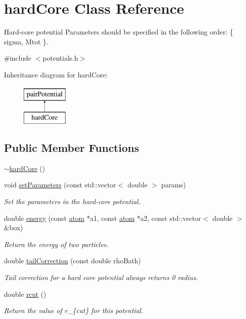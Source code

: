 \hypertarget{classhard_core}{\section{hard\-Core Class Reference}
\label{classhard_core}
}


Hard-\/core potential Parameters should be specified in the following order\-: \{ sigma, Mtot \}.  




{\ttfamily \#include $<$potentials.\-h$>$}

Inheritance diagram for hard\-Core\-:\begin{figure}[H]
\begin{center}
\leavevmode
\includegraphics[height=2.000000cm]{classhard_core}
\end{center}
\end{figure}
\subsection*{Public Member Functions}
\begin{DoxyCompactItemize}
\item 
\hyperlink{classhard_core_aea5b04b2f9271269d6365ff7ed633151}{$\sim$hard\-Core} ()
\item 
void \hyperlink{classhard_core_a2bbf6a77445f5cb5fc1a3c37ba0e6566}{set\-Parameters} (const std\-::vector$<$ double $>$ params)
\begin{DoxyCompactList}\small\item\em Set the parameters in the hard-\/core potential. \end{DoxyCompactList}\item 
double \hyperlink{classhard_core_a8b7bb56ce5c3ad31a74d352da76164e2}{energy} (const \hyperlink{classatom}{atom} $\ast$a1, const \hyperlink{classatom}{atom} $\ast$a2, const std\-::vector$<$ double $>$ \&box)
\begin{DoxyCompactList}\small\item\em Return the energy of two particles. \end{DoxyCompactList}\item 
double \hyperlink{classhard_core_a90c73dbda39a9c48f1f26474474183e4}{tail\-Correction} (const double rho\-Bath)
\begin{DoxyCompactList}\small\item\em Tail correction for a hard core potential always returns 0 radius. \end{DoxyCompactList}\item 
double \hyperlink{classhard_core_a3cbf5ecde18b2f2798a4b1aba1801ca5}{rcut} ()
\begin{DoxyCompactList}\small\item\em Return the value of r\-\_\-\{cut\} for this potential. \end{DoxyCompactList}\end{DoxyCompactItemize}
